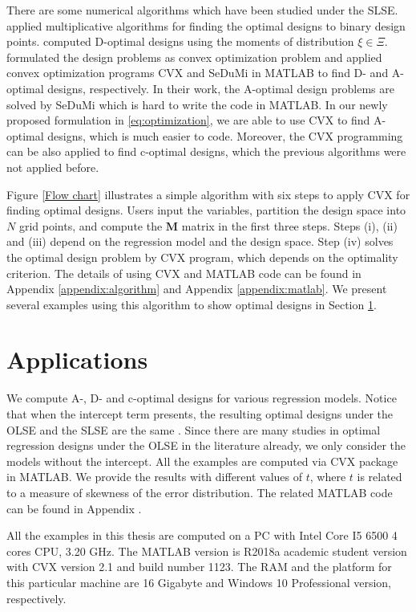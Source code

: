\documentclass[
]{book}
\theoremstyle{definition}
\theoremstyle{definition}
\theoremstyle{definition}
\theoremstyle{definition}
\theoremstyle{remark}
\begin{document}
There are some numerical algorithms which have been studied under the SLSE. \citet{bose2015optimal} applied multiplicative algorithms for finding the optimal designs to binary design points. \citet{gao2017d} computed D-optimal designs using the moments of distribution \(\xi \in \Xi\). \citet{yin2018optimal} formulated the design problems as convex optimization problem and applied convex optimization programs CVX and SeDuMi in MATLAB to find D- and A-optimal designs, respectively. In their work, the A-optimal design problems are solved by SeDuMi which is hard to write the code in MATLAB. In our newly proposed formulation in \eqref{eq:optimization}, we are able to use CVX to find A-optimal designs, which is much easier to code. Moreover, the CVX programming can be also applied to find c-optimal designs, which the previous algorithms were not applied before.

Figure \ref{Flow chart} illustrates a simple algorithm with six steps to apply CVX for finding optimal designs. Users input the variables, partition the design space into \(N\) grid points, and compute the \(\boldsymbol{M}\) matrix in the first three steps. Steps (i), (ii) and (iii) depend on the regression model and the design space. Step (iv) solves the optimal design problem by CVX program, which depends on the optimality criterion. The details of using CVX and MATLAB code can be found in Appendix \ref{appendix:algorithm} and Appendix \ref{appendix:matlab}. We present several examples using this algorithm to show optimal designs in Section \ref{section:applications}.

\section{Applications}\label{section:applications}

We compute A-, D- and c-optimal designs for various regression models. Notice that when the intercept term presents, the resulting optimal designs under the OLSE and the SLSE are the same \citet{gao2014new}. Since there are many studies in optimal regression designs under the OLSE in the literature already, we only consider the models without the intercept. All the examples are computed via CVX package in MATLAB. We provide the results with different values of \(t\), where \(t\) is related to a measure of skewness of the error distribution. The related MATLAB code can be found in Appendix \citet{appendix:matlab}.

All the examples in this thesis are computed on a PC with Intel Core I5 6500 4 cores CPU, 3.20 GHz. The MATLAB version is R2018a academic student version with CVX version 2.1 and build number 1123. The RAM and the platform for this particular machine are 16 Gigabyte and Windows 10 Professional version, respectively.
\end{document}

